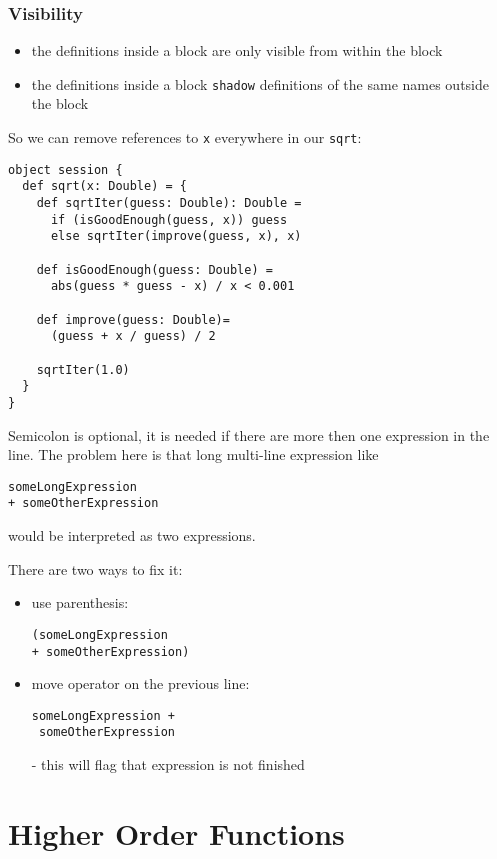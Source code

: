 \documentclass{scrartcl}
\newcommand{\term}[1]{\verb~#1~} %
\begin{document}
\subsubsection{Visibility}
\label{sec:visibility}

\begin{itemize}
\item the definitions inside a block are only visible from within the block
\item the definitions inside a block \term{shadow} definitions of the same names
  outside the block
\end{itemize}
So we can remove references to \lstinline|x| everywhere in our \lstinline|sqrt|:
\begin{lstlisting}
object session {
  def sqrt(x: Double) = {
    def sqrtIter(guess: Double): Double =
      if (isGoodEnough(guess, x)) guess
      else sqrtIter(improve(guess, x), x)

    def isGoodEnough(guess: Double) =
      abs(guess * guess - x) / x < 0.001

    def improve(guess: Double)=
      (guess + x / guess) / 2

    sqrtIter(1.0)
  }
}
\end{lstlisting}

Semicolon is optional, it is needed if there are more then one expression in the
line. The problem here is that long multi-line expression like
\begin{lstlisting}
someLongExpression
+ someOtherExpression
\end{lstlisting}
would be interpreted as two expressions.

There are two ways to fix it:
\begin{itemize}
\item use parenthesis:
\begin{lstlisting}
(someLongExpression
+ someOtherExpression)
\end{lstlisting}
\item move operator on the previous line:
\begin{lstlisting}
someLongExpression +
 someOtherExpression
\end{lstlisting}
  - this will flag that expression is not finished
\end{itemize}

\section{Higher Order Functions}
\label{sec:Lection2-HigherOrderFunctions}
\end{document}
